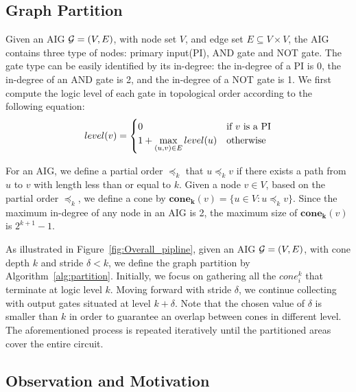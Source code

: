 \subsection{Graph Partition}
\label{sec:Graph_Partition}
Given an AIG $\displaystyle {\mathcal{G}}=(V,E)$, with node set $V$, and edge set $E\subseteq V\times V$, the AIG contains three type of nodes: primary input(PI), AND gate and NOT gate. The gate type can be easily identified by its in-degree: the in-degree of a PI is 0, the in-degree of an AND gate is 2, and the in-degree of a NOT gate is 1.
We first compute the logic level of each gate in topological order according to the following equation:
\vspace{-5pt}
\begin{equation}
level(v) =
\begin{cases} 
0 & \text{if } v \text{ is a PI} \\
1 + \max\limits_{(u,v) \in E} level(u) & \text{otherwise}
\end{cases}
\vspace{-5pt}
\end{equation}



For an AIG, we define a partial order $\preccurlyeq_k$ that $u \preccurlyeq_k v$ if there exists a path from $u$ to $v$ with length less than or equal to $k$.
Given a node $v\in V$, based on the partial order $\preccurlyeq_k$, we define a cone by $\mathbf{cone_k}(v)=\{u\in V: u \preccurlyeq_k v\}$. Since the maximum in-degree of any node in an AIG is 2, the maximum size of $\mathbf{cone_k}(v)$ is $2^{k+1}-1$.

As illustrated in Figure~\ref{fig:Overall_pipline}, given an AIG $\displaystyle {\mathcal{G}}=(V,E)$, with cone depth $k$ and stride $\delta<k$, we define the graph partition by Algorithm~\ref{alg:partition}. 
Initially, we focus on gathering all the $cone^k_i$ that terminate at logic level $k$.  Moving forward with stride $\delta$, we continue collecting with output gates situated at level $k+\delta$. Note that the chosen value of $\delta$ is smaller than $k$ in order to guarantee an overlap between cones in different level. The aforementioned process is repeated iteratively until the partitioned areas cover the entire circuit.  





\subsection{Observation and Motivation}
\label{sec:Observation}


